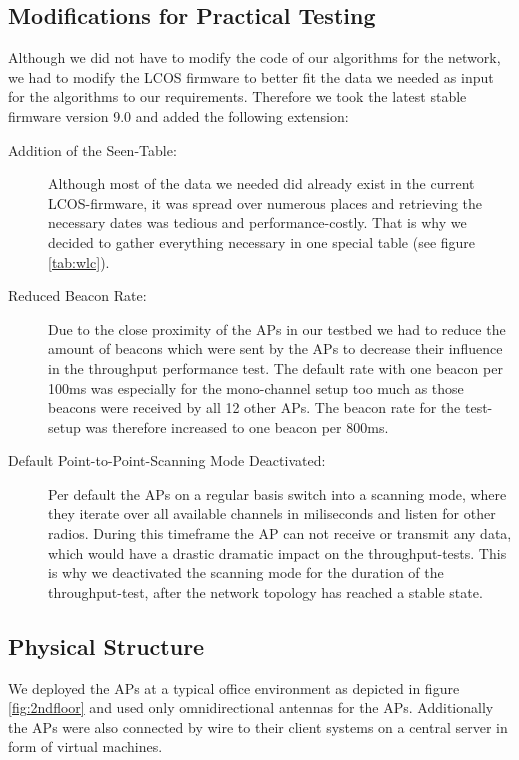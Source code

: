     \subsection{Modifications for Practical Testing}
      Although we did not have to modify the code of our algorithms for the network, we had to modify the \ac{LCOS} firmware to better fit the 
      data we needed as input for the algorithms to our requirements. Therefore we took the latest stable firmware version 9.0 and added the following extension:
      \begin{description}
	\item[Addition of the Seen-Table:]
	  Although most of the data we needed did already exist in the current \ac{LCOS}-firmware, it was spread over numerous places and retrieving the necessary dates
	  was tedious and performance-costly. That is why we decided to gather everything necessary in one special table (see figure \ref{tab:wlc}).
	\item[Reduced Beacon Rate:]
	  Due to the close proximity of the APs in our testbed we had to reduce the amount of beacons which were sent by the APs to decrease their influence in 
	  the throughput performance test. The default rate with one beacon per 100ms was especially for the mono-channel setup too much as those beacons were received
	  by all 12 other APs. The beacon rate for the test-setup was therefore increased to one beacon per 800ms.
	\item[Default Point-to-Point-Scanning Mode Deactivated:]
	  Per default the APs on a regular basis switch into a scanning mode, where they iterate over all available channels in miliseconds and listen for
	  other radios. During this timeframe the AP can not receive or transmit any data, which would have a drastic dramatic impact on the throughput-tests.
	  This is why we deactivated the scanning mode for the duration of the throughput-test, after the network topology has reached a stable state.
      \end{description}
   
\newpage
   
    \subsection{Physical Structure}
      We deployed the APs at a typical office environment as depicted in figure \ref{fig:2ndfloor} and used only omnidirectional antennas for the APs.
      Additionally the APs were also connected by wire to their client systems on a central server in form of virtual machines.
      
